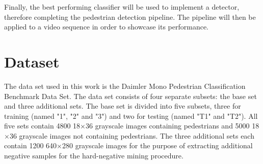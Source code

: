 \documentclass[journal,twocolumn]{IEEEtran}
\begin{document}
Finally, the best performing classifier will be used to implement a detector, therefore completing the pedestrian detection pipeline. The pipeline will then be applied to a video sequence in order to showcase its performance.

\section{Dataset}
\label{sec:data}

The data set used in this work is the Daimler Mono Pedestrian Classification Benchmark Data Set\cite{3}. The data set consists of four separate subsets: the base set and three additional sets. The base set is divided into five subsets, three for training (named "1", "2" and "3") and two for testing (named "T1" and "T2"). All five sets contain 4800 18$\times$36 grayscale images containing pedestrians and 5000 18$\times$36 grayscale images not containing pedestrians. The three additional sets each contain 1200 640$\times$280 grayscale images for the purpose of extracting additional negative samples for the hard-negative mining procedure.
\end{document}
